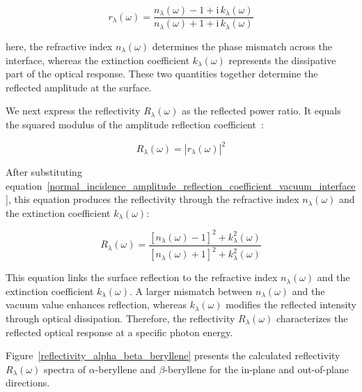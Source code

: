 \begin{equation}
    r_{\lambda}(\omega) =
    \frac{n_{\lambda}(\omega)-1+\mathrm{i}\,k_{\lambda}(\omega)}
    {n_{\lambda}(\omega)+1+\mathrm{i}\,k_{\lambda}(\omega)}
\label{normal_incidence_amplitude_reflection_coefficient_vacuum_interface}
\end{equation}

here, the refractive index $n_{\lambda}(\omega)$ determines the phase mismatch across the interface,
whereas the extinction coefficient $k_{\lambda}(\omega)$ represents the dissipative part of the optical response.
These two quantities together determine the reflected amplitude at the surface.

We next express the reflectivity $R_{\lambda}(\omega)$ as the reflected power ratio.
It equals the squared modulus of the amplitude reflection coefficient~\cite{born2013principles,wooten2013optical,dressel2002electrodynamics}:

\begin{equation}
    R_{\lambda}(\omega)
    = \left|r_{\lambda}(\omega)\right|^2
\label{reflectivity_from_amplitude_reflection_coefficient}
\end{equation}

After substituting equation~\eqref{normal_incidence_amplitude_reflection_coefficient_vacuum_interface},
this equation produces the reflectivity through the refractive index $n_\lambda(\omega)$ and the extinction coefficient $k_\lambda(\omega)$:

\begin{equation}
    R_{\lambda}(\omega) =
    \frac{\left[n_\lambda(\omega)-1\right]^2+k_\lambda^2(\omega)}
    {\left[n_\lambda(\omega)+1\right]^2+k_\lambda^2(\omega)}
\label{reflectivity_from_refractive_index_and_extinction_coefficient}
\end{equation}

This equation links the surface reflection to the refractive index $n_{\lambda}(\omega)$ and the extinction coefficient $k_{\lambda}(\omega)$.
A larger mismatch between $n_{\lambda}(\omega)$ and the vacuum value enhances reflection,
whereas $k_{\lambda}(\omega)$ modifies the reflected intensity through optical dissipation.
Therefore, the reflectivity $R_{\lambda}(\omega)$ characterizes the reflected optical response at a specific photon energy.

Figure~\ref{reflectivity_alpha_beta_beryllene} presents the calculated reflectivity $R_{\lambda}(\omega)$ spectra of $\alpha$-beryllene and $\beta$-beryllene for the in-plane and out-of-plane directions.

